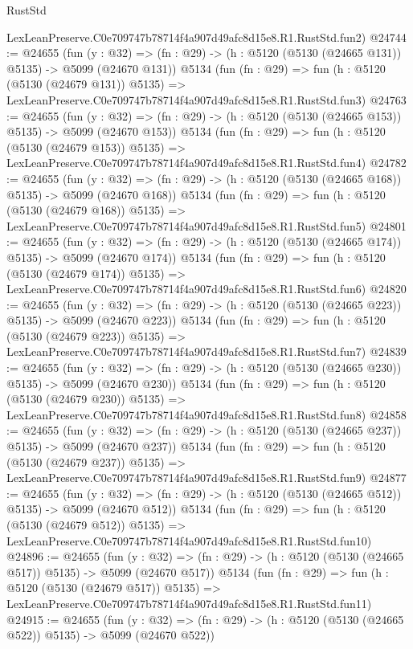\begin{lexlean}{RustStd}
\begin{coremodule}
    LexLeanPreserve.C0e709747b78714f4a907d49afc8d15e8.R1.RustStd.fun2)
@24744 := @24655
    (fun (y : @32) => (fn : @29) -> (h : @5120 (@5130 (@24665 @131)) @5135) -> @5099 (@24670 @131))
    @5134
    (fun (fn : @29) =>
    fun (h : @5120 (@5130 (@24679 @131)) @5135) =>
    LexLeanPreserve.C0e709747b78714f4a907d49afc8d15e8.R1.RustStd.fun3)
@24763 := @24655
    (fun (y : @32) => (fn : @29) -> (h : @5120 (@5130 (@24665 @153)) @5135) -> @5099 (@24670 @153))
    @5134
    (fun (fn : @29) =>
    fun (h : @5120 (@5130 (@24679 @153)) @5135) =>
    LexLeanPreserve.C0e709747b78714f4a907d49afc8d15e8.R1.RustStd.fun4)
@24782 := @24655
    (fun (y : @32) => (fn : @29) -> (h : @5120 (@5130 (@24665 @168)) @5135) -> @5099 (@24670 @168))
    @5134
    (fun (fn : @29) =>
    fun (h : @5120 (@5130 (@24679 @168)) @5135) =>
    LexLeanPreserve.C0e709747b78714f4a907d49afc8d15e8.R1.RustStd.fun5)
@24801 := @24655
    (fun (y : @32) => (fn : @29) -> (h : @5120 (@5130 (@24665 @174)) @5135) -> @5099 (@24670 @174))
    @5134
    (fun (fn : @29) =>
    fun (h : @5120 (@5130 (@24679 @174)) @5135) =>
    LexLeanPreserve.C0e709747b78714f4a907d49afc8d15e8.R1.RustStd.fun6)
@24820 := @24655
    (fun (y : @32) => (fn : @29) -> (h : @5120 (@5130 (@24665 @223)) @5135) -> @5099 (@24670 @223))
    @5134
    (fun (fn : @29) =>
    fun (h : @5120 (@5130 (@24679 @223)) @5135) =>
    LexLeanPreserve.C0e709747b78714f4a907d49afc8d15e8.R1.RustStd.fun7)
@24839 := @24655
    (fun (y : @32) => (fn : @29) -> (h : @5120 (@5130 (@24665 @230)) @5135) -> @5099 (@24670 @230))
    @5134
    (fun (fn : @29) =>
    fun (h : @5120 (@5130 (@24679 @230)) @5135) =>
    LexLeanPreserve.C0e709747b78714f4a907d49afc8d15e8.R1.RustStd.fun8)
@24858 := @24655
    (fun (y : @32) => (fn : @29) -> (h : @5120 (@5130 (@24665 @237)) @5135) -> @5099 (@24670 @237))
    @5134
    (fun (fn : @29) =>
    fun (h : @5120 (@5130 (@24679 @237)) @5135) =>
    LexLeanPreserve.C0e709747b78714f4a907d49afc8d15e8.R1.RustStd.fun9)
@24877 := @24655
    (fun (y : @32) => (fn : @29) -> (h : @5120 (@5130 (@24665 @512)) @5135) -> @5099 (@24670 @512))
    @5134
    (fun (fn : @29) =>
    fun (h : @5120 (@5130 (@24679 @512)) @5135) =>
    LexLeanPreserve.C0e709747b78714f4a907d49afc8d15e8.R1.RustStd.fun10)
@24896 := @24655
    (fun (y : @32) => (fn : @29) -> (h : @5120 (@5130 (@24665 @517)) @5135) -> @5099 (@24670 @517))
    @5134
    (fun (fn : @29) =>
    fun (h : @5120 (@5130 (@24679 @517)) @5135) =>
    LexLeanPreserve.C0e709747b78714f4a907d49afc8d15e8.R1.RustStd.fun11)
@24915 := @24655
    (fun (y : @32) => (fn : @29) -> (h : @5120 (@5130 (@24665 @522)) @5135) -> @5099 (@24670 @522))

\end{coremodule}
\end{lexlean}
